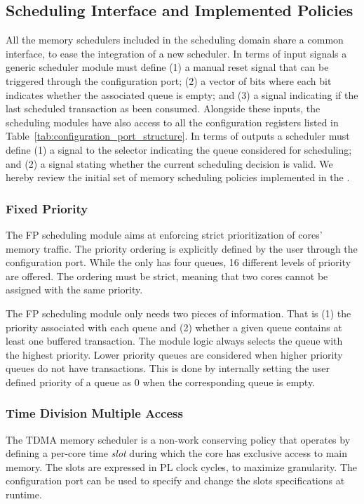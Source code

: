 \subsection{Scheduling Interface and Implemented Policies}\label{sec:sched_interf}
All the memory schedulers included in the scheduling domain share a
common interface, to ease the integration of a new scheduler. In terms
of input signals a generic scheduler module must define (1) a manual
reset signal that can be triggered through the configuration port; (2)
a vector of bits where each bit indicates whether the associated queue
is empty; and (3) a signal indicating if the last scheduled
transaction as been consumed. Alongside these inputs, the scheduling
modules have also access to all the configuration registers listed in
Table~\ref{tab:configuration_port_structure}. In terms of outputs a
\schim scheduler must define (1) a signal to the selector indicating
the queue considered for scheduling; and (2) a signal stating whether
the current scheduling decision is valid. We hereby review the initial
set of memory scheduling policies implemented in the \schim.

\subsubsection{Fixed Priority}
The FP scheduling module aims at enforcing strict prioritization of
cores' memory traffic. The priority ordering is explicitly defined by
the user through the configuration port. While the \schim only has
four queues, 16 different levels of priority are offered. The ordering
must be strict, meaning that two cores cannot be assigned with the
same priority.

The FP scheduling module only needs two pieces of information. That is
(1) the priority associated with each queue and (2) whether a given
queue contains at least one buffered transaction. The module logic
always selects the queue with the highest priority. Lower priority
queues are considered when higher priority queues do not have
transactions. This is done by internally setting the user defined
priority of a queue as 0 when the corresponding queue is empty.

\subsubsection{Time Division Multiple Access}
The TDMA memory scheduler is a non-work conserving policy that
operates by defining a per-core time \emph{slot} during which the core
has exclusive access to main memory.  The slots are expressed in PL
clock cycles, to maximize granularity. The configuration port can be
used to specify and change the slots specifications at runtime.

